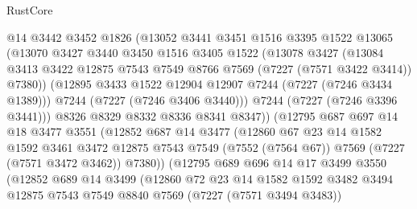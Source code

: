 \begin{lexlean}{RustCore}
\begin{coremodule}
                  @14
                  @3442
                  @3452
                  @1826
                  (@13052
                    @3441
                    @3451
                    @1516
                    @3395
                    @1522
                    @13065
                    (@13070
                      @3427
                      @3440
                      @3450
                      @1516
                      @3405
                      @1522
                      (@13078
                        @3427
                        (@13084
                          @3413
                          @3422
                          @12875
                          @7543
                          @7549
                          @8766
                          @7569
                          (@7227 (@7571 @3422 @3414))
                          @7380))
                      (@12895 @3433 @1522 @12904 @12907 @7244 (@7227 (@7246 @3434 @1389)))
                      @7244
                      (@7227 (@7246 @3406 @3440)))
                    @7244
                    (@7227 (@7246 @3396 @3441)))
                  @8326
                  @8329
                  @8332
                  @8336
                  @8341
                  @8347))
              (@12795
                @687
                @697
                @14
                @18
                @3477
                @3551
                (@12852
                  @687
                  @14
                  @3477
                  (@12860
                    @67
                    @23
                    @14
                    @1582
                    @1592
                    @3461
                    @3472
                    @12875
                    @7543
                    @7549
                    (@7552 (@7564 @67))
                    @7569
                    (@7227 (@7571 @3472 @3462))
                    @7380))
                (@12795
                  @689
                  @696
                  @14
                  @17
                  @3499
                  @3550
                  (@12852
                    @689
                    @14
                    @3499
                    (@12860
                      @72
                      @23
                      @14
                      @1582
                      @1592
                      @3482
                      @3494
                      @12875
                      @7543
                      @7549
                      @8840
                      @7569
                      (@7227 (@7571 @3494 @3483))

\end{coremodule}
\end{lexlean}
